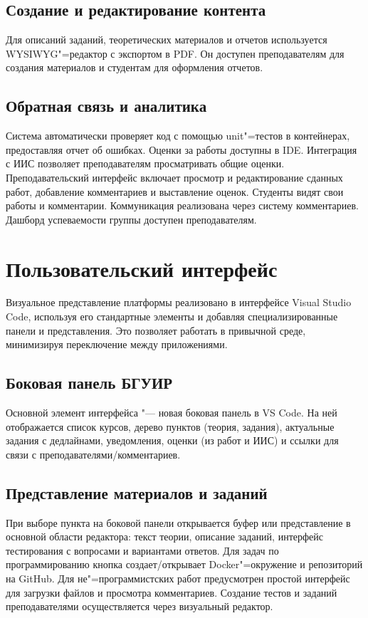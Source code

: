 \documentclass{bsuir}
\begin{document}
\subsection{Создание и редактирование контента}
Для описаний заданий, теоретических материалов и отчетов используется
WYSIWYG"=редактор с экспортом в PDF. Он доступен преподавателям для создания
материалов и студентам для оформления отчетов.

\subsection{Обратная связь и аналитика}
Система автоматически проверяет код с помощью unit"=тестов в контейнерах,
предоставляя отчет об ошибках. Оценки за работы доступны в IDE. Интеграция с ИИС
позволяет преподавателям просматривать общие оценки. Преподавательский интерфейс
включает просмотр и редактирование сданных работ, добавление комментариев и
выставление оценок. Студенты видят свои работы и комментарии. Коммуникация
реализована через систему комментариев. Дашборд успеваемости группы доступен
преподавателям.

\section{Пользовательский интерфейс}

Визуальное представление платформы реализовано в интерфейсе Visual Studio Code,
используя его стандартные элементы и добавляя специализированные панели и
представления. Это позволяет работать в привычной среде, минимизируя
переключение между приложениями.

\subsection{Боковая панель БГУИР}
Основной элемент интерфейса "--- новая боковая панель в VS Code. На ней
отображается список курсов, дерево пунктов (теория, задания), актуальные задания
с дедлайнами, уведомления, оценки (из работ и ИИС) и ссылки для связи с
преподавателями/комментариев.

\subsection{Представление материалов и заданий}
При выборе пункта на боковой панели открывается буфер или представление в
основной области редактора: текст теории, описание заданий, интерфейс
тестирования с вопросами и вариантами ответов. Для задач по программированию
кнопка  создает/открывает Docker"=окружение и
репозиторий на GitHub. Для не"=программистских работ предусмотрен простой
интерфейс для загрузки файлов и просмотра комментариев. Создание тестов и
заданий преподавателями осуществляется через визуальный редактор.
\end{document}
